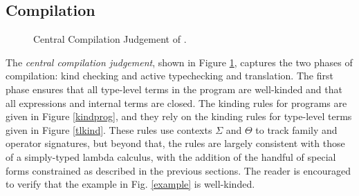 \documentclass{llncs}
\begin{document}
\subsection{Compilation}
\begin{figure}[t]
\small
\begin{mathpar}
\end{mathpar}
\vspace{-10pt}
\caption{\small Central Compilation Judgement of \atlam.}
\label{ccj}
\end{figure}
The \emph{central compilation judgement}, shown in Figure \ref{ccj}, captures the two phases of compilation: kind checking and active typechecking and translation. 
The first phase ensures that all type-level terms in the program are well-kinded and that all expressions and internal terms are closed. The kinding rules for programs are given in Figure \ref{kindprog}, and they rely on the kinding rules for type-level terms given in Figure \ref{tlkind}. These rules use contexts $\Sigma$ and $\Theta$ to track family and operator signatures, but beyond that, the rules are largely consistent with those of a simply-typed lambda calculus, with the addition of the handful of special forms constrained as described in the previous sections. The reader is encouraged to verify that the example in Fig. \ref{example} is well-kinded. 
\end{document}
